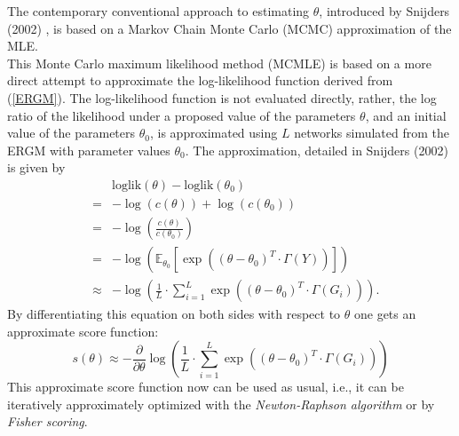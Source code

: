 \documentclass[10pt, conference, compsocconf]{IEEEtran}
\begin{document}
The contemporary conventional approach to estimating $\theta$, introduced by Snijders (2002) \cite{snijders2002markov}, is based on a Markov Chain Monte Carlo (MCMC) approximation of the MLE.\\[0.3cm]
This Monte Carlo maximum likelihood method (MCMLE) is based on a more direct attempt to approximate the  log-likelihood function derived from (\ref{ERGM}). The log-likelihood function is not evaluated directly, rather, the log ratio of the likelihood under a proposed value of the parameters $\theta$, and an initial value of the parameters $\theta_0$, is approximated using $L$ networks simulated from the ERGM with parameter values $\theta_0$. The approximation, detailed in Snijders (2002) \cite{snijders2002markov} is given by 
%
\begin{eqnarray*}
&&\text{loglik}(\theta)-\text{loglik}(\theta_0)\\&=&- \log(c(\theta))+\log(c(\theta_0))\\
                                             &=&- \log \left( \frac{c(\theta)}{c(\theta_0)} \right)\\
                                             &=&- \log \left( \mathbb{E}_{\theta_0}\left[ \exp\left((\theta - \theta_0)^T \cdot \Gamma(Y)\right) \right] \right)\\
                                             &\approx &- \log \left( \frac{1}{L} \cdot \sum_{i=1}^{L}  \exp \left((\theta - \theta_0)^T \cdot \Gamma(G_i) \right) \right).
\end{eqnarray*}
By differentiating this equation on both sides with respect to $\theta$ one gets an approximate score function:
%
\begin{equation}
s(\theta) \approx -\frac{\partial}{\partial \theta} \log \left( \frac{1}{L} \cdot \sum_{i=1}^{L}  \exp \left((\theta - \theta_0)^T \cdot \Gamma(G_i) \right) \right)
\label{score}
\end{equation}
%
This approximate score function now can be used as usual, i.e., it can be iteratively approximately optimized with the \textit{Newton-Raphson algorithm} or by \textit{Fisher scoring}. 
\end{document}
